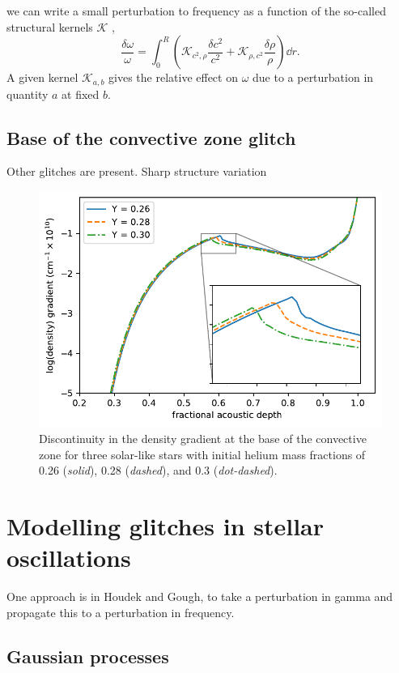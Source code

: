 we can write a small perturbation to frequency as a function of the so-called structural kernels \(\mathcal{K}\) ,
%
\begin{equation}
    \frac{\delta\omega}{\omega} = \int_0^R \left(\mathcal{K}_{c^2,\rho} \frac{\delta c^2}{c^2} + \mathcal{K}_{\rho,c^2} \frac{\delta \rho}{\rho} \right) \dd r.
\end{equation}
%
A given kernel \(\mathcal{K}_{a, b}\) gives the relative effect on \(\omega\) due to a perturbation in quantity \(a\) at fixed \(b\).


\subsection{Base of the convective zone glitch}\label{sec:bcz-glitch}

Other glitches are present. Sharp structure variation

\begin{figure}
    \centering
    \includegraphics{figures/bcz-density-gradient.pdf}
    \caption{Discontinuity in the density gradient at the base of the convective zone for three solar-like stars with initial helium mass fractions of 0.26 (\emph{solid}), 0.28 (\emph{dashed}), and 0.3 (\emph{dot-dashed}).}
    \label{fig:bcz-density}
\end{figure}

\section[Modelling the glitch]{Modelling glitches in stellar oscillations}

One approach is in Houdek and Gough, to take a perturbation in gamma and propagate this to a perturbation in frequency.

\subsection{Gaussian processes }\label{sec:glitch-gp}

